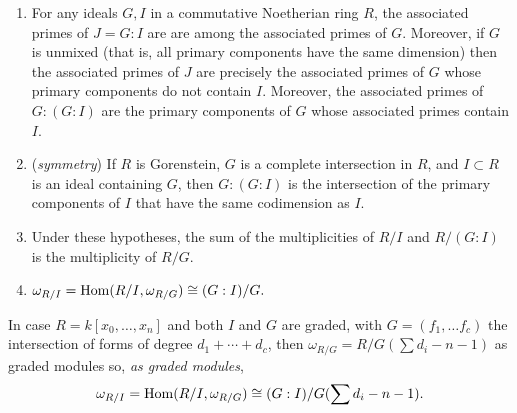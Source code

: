 \begin{theorem} \label{double colon}
\begin{enumerate}
\item For any ideals $G,I$ in a commutative Noetherian ring $R$, the associated primes of  $J = G:I$ are  are among the associated primes of $G$. Moreover, if $G$ is unmixed (that is, all primary components have the same dimension) then  
the associated primes of $J$ are precisely the associated primes of $G$ whose primary components do not contain $I$.
Moreover, the associated primes of $G:(G:I)$ are the primary components of $G$ whose associated primes contain $I$.

\item (\emph{symmetry}) If $R$ is Gorenstein, $G$ is a complete intersection in $R$, and $I\subset R$ is an ideal containing $G$, then $G:(G:I)$ is the 
intersection of the primary components of $I$ that have the same codimension as $I$. 

\item Under these hypotheses, the sum of the multiplicities of $R/I$ and $R/(G:I)$ is the multiplicity of $R/G$.

\item 
$
\omega_{R/I} = \Hom(R/I, \omega_{R/G})\cong (G:I)/G.
$\\
\end{enumerate}
\end{theorem}

In case $R = k[x_{0},\dots,x_{n}]$ and both $I$ and $G$ are graded, with $G = (f_{1}, \dots f_{c})$ the intersection of forms of degree
$d_{1}+\cdots + d_{c}$, then $\omega_{R/G} = R/G(\sum d_{i} -n-1)$ as graded modules so, \emph{as graded modules},
$$
\omega_{R/I} = \Hom(R/I, \omega_{R/G})\cong (G:I)/G(\sum d_{i} -n-1).
$$


